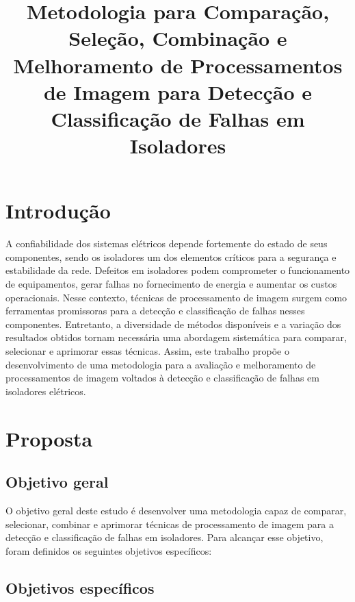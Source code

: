 \documentclass[12pt]{article}
\title{Metodologia para Comparação, Seleção, Combinação e Melhoramento de Processamentos de Imagem para Detecção e Classificação de Falhas em Isoladores}
\author{}
\date{}
\begin{document}
\maketitle

\section{Introdução}

A confiabilidade dos sistemas elétricos depende fortemente do estado de seus componentes, sendo os isoladores um dos elementos críticos para a segurança e estabilidade da rede. Defeitos em isoladores podem comprometer o funcionamento de equipamentos, gerar falhas no fornecimento de energia e aumentar os custos operacionais. Nesse contexto, técnicas de processamento de imagem surgem como ferramentas promissoras para a detecção e classificação de falhas nesses componentes. Entretanto, a diversidade de métodos disponíveis e a variação dos resultados obtidos tornam necessária uma abordagem sistemática para comparar, selecionar e aprimorar essas técnicas. Assim, este trabalho propõe o desenvolvimento de uma metodologia para a avaliação e melhoramento de processamentos de imagem voltados à detecção e classificação de falhas em isoladores elétricos.

\section{Proposta}

\subsection{Objetivo geral}

O objetivo geral deste estudo é desenvolver uma metodologia capaz de comparar, selecionar, combinar e aprimorar técnicas de processamento de imagem para a detecção e classificação de falhas em isoladores. Para alcançar esse objetivo, foram definidos os seguintes objetivos específicos:

\subsection{Objetivos específicos}
\end{document}
